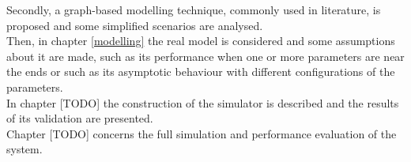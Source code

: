 Secondly, a graph-based modelling technique, commonly used in literature, is proposed and some simplified scenarios are analysed.\\
Then, in chapter \ref{modelling} the real model is considered and some assumptions about it are made, such as its performance when one or more parameters are near the ends or such as its asymptotic behaviour with different configurations of the parameters.\\
In chapter [TODO] the construction of the simulator is described and the results of its validation are presented.\\
Chapter [TODO] concerns the full simulation and performance evaluation of the system.
